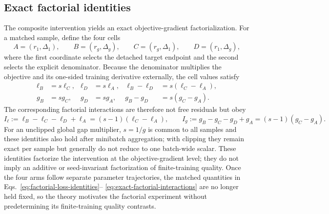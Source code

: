 \subsection{Exact factorial identities}
\label{sec:theory-factorial-identities}

The composite intervention yields an exact objective-gradient factorialization.
For a matched sample, define the four cells
\begin{equation}
  A=(r_1,\Delta_1),\qquad
  B=(r_g,\Delta_g),\qquad
  C=(r_g,\Delta_1),\qquad
  D=(r_1,\Delta_g),
  \label{eq:factorial-cells}
\end{equation}
where the first coordinate selects the detached target endpoint and the second
selects the explicit denominator. Because the denominator multiplies the
objective and its one-sided training derivative externally, the cell values
satisfy
\begin{align}
  \ell_B&=s\ell_C,&
  \ell_D&=s\ell_A,&
  \ell_B-\ell_D&=s(\ell_C-\ell_A),
  \label{eq:factorial-loss-identities}\\
  g_B&=s g_C,&
  g_D&=s g_A,&
  g_B-g_D&=s(g_C-g_A).
  \label{eq:factorial-gradient-identities}
\end{align}
The corresponding factorial interactions are therefore not free residuals but
obey
\begin{equation}
  I_\ell:=\ell_B-\ell_C-\ell_D+\ell_A
  =(s-1)(\ell_C-\ell_A),
  \qquad
  I_g:=g_B-g_C-g_D+g_A
  =(s-1)(g_C-g_A).
  \label{eq:exact-factorial-interactions}
\end{equation}
For an unclipped global gap multiplier, $s=1/g$ is common to all samples and
these identities also hold after minibatch aggregation; with clipping they
remain exact per sample but generally do not reduce to one batch-wide scalar.
These identities factorize the intervention at the objective-gradient level;
they do not imply an additive or seed-invariant factorization of finite-training
quality. Once the four arms follow separate parameter trajectories, the matched
quantities in Eqs.~\eqref{eq:factorial-loss-identities}--
\eqref{eq:exact-factorial-interactions} are no longer held fixed, so the theory
motivates the factorial experiment without predetermining its finite-training
quality contrasts.
